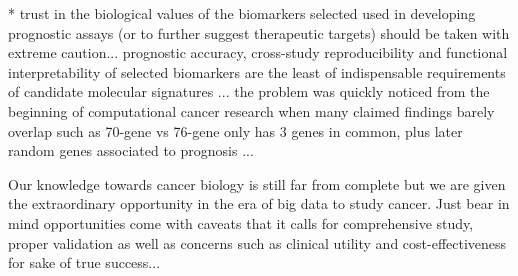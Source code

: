 * trust in the biological values of the biomarkers selected used in developing prognostic assays (or to further suggest therapeutic targets) should be taken with extreme caution... prognostic accuracy, cross-study reproducibility and functional interpretability of selected biomarkers are the least of indispensable requirements of candidate molecular signatures \cite{Haury2011influence}... the problem was quickly noticed from the beginning of computational cancer research when many claimed findings barely overlap such as 70-gene vs 76-gene only has 3 genes in common, plus later random genes associated to prognosis \cite{Venet2011Most}...

Our knowledge towards cancer biology is still far from complete but we are given the extraordinary opportunity in the era of big data to study cancer. Just bear in mind opportunities come with caveats that it calls for comprehensive study, proper validation as well as concerns such as clinical utility and cost-effectiveness for sake of true success...
